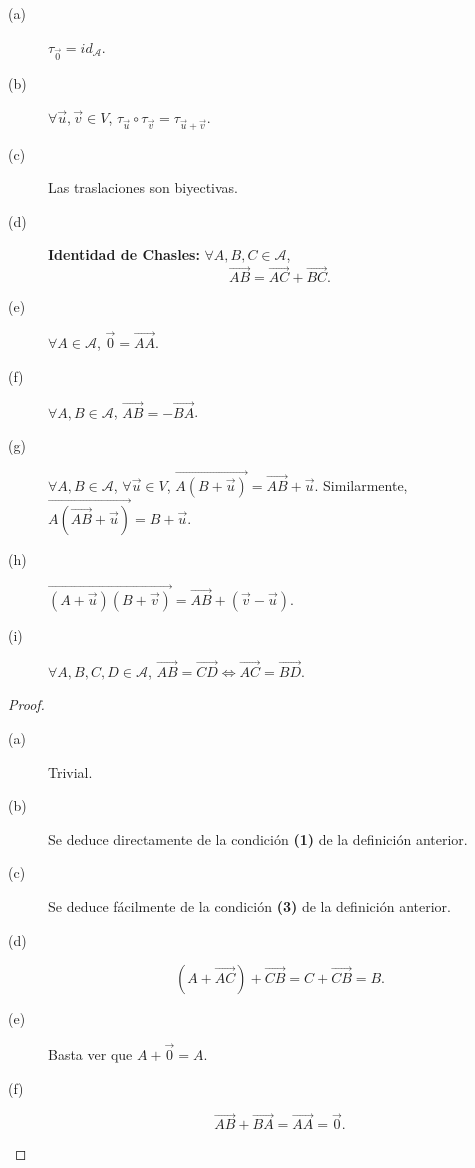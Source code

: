 \begin{fprop}[]
\normalfont 
\begin{description}
\item[(a)] $\displaystyle \tau_{\vec{0}} = id _{\mathcal{A}} $.
\item[(b)] $\displaystyle \forall \vec{u}, \vec{v} \in V $, $\displaystyle \tau_{\vec{u}}\circ\tau_{\vec{v}} = \tau_{\vec{u} +\vec{v}} $.
\item[(c)] Las traslaciones son biyectivas.
\item[(d)] \textbf{Identidad de Chasles:} $\displaystyle \forall A,B,C \in \mathcal{A} $, 
	\[\overrightarrow{AB} = \overrightarrow{AC} +\overrightarrow{BC} .\]
\item[(e)] $\displaystyle \forall A \in \mathcal{A} $, $\displaystyle \vec{0} = \overrightarrow{AA} $.
\item[(f)] $\displaystyle \forall A,B \in \mathcal{A} $, $\displaystyle \overrightarrow{AB} = -\overrightarrow{BA} $.
\item[(g)] $\displaystyle \forall A,B \in \mathcal{A} $, $\displaystyle \forall \vec{u} \in V $, $\displaystyle \overrightarrow{A\left(B+\vec{u}\right)} = \overrightarrow{AB} + \vec{u}$. Similarmente, $\displaystyle \overrightarrow{A\left(\overrightarrow{AB}+\vec{u}\right)} = B + \vec{u}$.
\item[(h)] $\displaystyle \overrightarrow{\left(A+\vec{u}\right)\left(B+\vec{v}\right)} = \overrightarrow{AB} + \left(\vec{v}-\vec{u}\right)$.
\item[(i)] $\displaystyle \forall A,B,C,D \in \mathcal{A} $, $\displaystyle \overrightarrow{AB} = \overrightarrow{CD} \iff \overrightarrow{AC} = \overrightarrow{BD}$.
\end{description}
\end{fprop}
\begin{proof}
\begin{description}
\item[(a)] Trivial.
\item[(b)] Se deduce directamente de la condición \textbf{(1)} de la definición anterior.
\item[(c)] Se deduce fácilmente de la condición \textbf{(3)} de la definición anterior.
\item[(d)]
	\[\left(A + \overrightarrow{AC}\right) + \overrightarrow{CB} = C + \overrightarrow{CB} = B .\]
\item[(e)] Basta ver que $\displaystyle A + \vec{0} = A $.
\item[(f)]
	\[\overrightarrow{AB} + \overrightarrow{BA} = \overrightarrow{AA} = \vec{0} .\]	
\end{description}
\end{proof}
